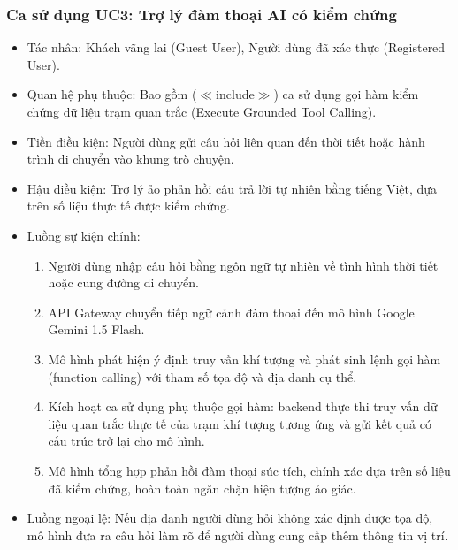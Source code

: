 \subsubsection{Ca sử dụng UC3: Trợ lý đàm thoại AI có kiểm chứng}
\begin{itemize}
    \item Tác nhân: Khách vãng lai (Guest User), Người dùng đã xác thực (Registered User).
    \item Quan hệ phụ thuộc: Bao gồm ($\ll$include$\gg$) ca sử dụng gọi hàm kiểm chứng dữ liệu trạm quan trắc (Execute Grounded Tool Calling).
    \item Tiền điều kiện: Người dùng gửi câu hỏi liên quan đến thời tiết hoặc hành trình di chuyển vào khung trò chuyện.
    \item Hậu điều kiện: Trợ lý ảo phản hồi câu trả lời tự nhiên bằng tiếng Việt, dựa trên số liệu thực tế được kiểm chứng.
    \item Luồng sự kiện chính:
    \begin{enumerate}
        \item Người dùng nhập câu hỏi bằng ngôn ngữ tự nhiên về tình hình thời tiết hoặc cung đường di chuyển.
        \item API Gateway chuyển tiếp ngữ cảnh đàm thoại đến mô hình Google Gemini 1.5 Flash.
        \item Mô hình phát hiện ý định truy vấn khí tượng và phát sinh lệnh gọi hàm (function calling) với tham số tọa độ và địa danh cụ thể.
        \item Kích hoạt ca sử dụng phụ thuộc gọi hàm: backend thực thi truy vấn dữ liệu quan trắc thực tế của trạm khí tượng tương ứng và gửi kết quả có cấu trúc trở lại cho mô hình.
        \item Mô hình tổng hợp phản hồi đàm thoại súc tích, chính xác dựa trên số liệu đã kiểm chứng, hoàn toàn ngăn chặn hiện tượng ảo giác.
    \end{enumerate}
    \item Luồng ngoại lệ: Nếu địa danh người dùng hỏi không xác định được tọa độ, mô hình đưa ra câu hỏi làm rõ để người dùng cung cấp thêm thông tin vị trí.
\end{itemize}

